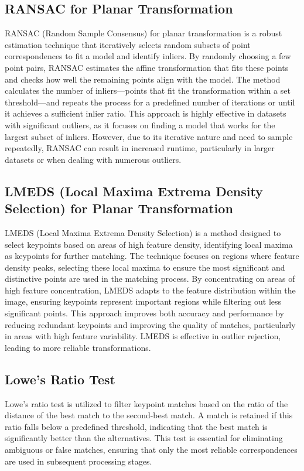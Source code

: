 \subsection*{RANSAC for Planar Transformation}
RANSAC (Random Sample Consensus) for planar transformation is a robust estimation technique that iteratively selects random subsets of point correspondences to fit a model and identify inliers. By randomly choosing a few point pairs, RANSAC estimates the affine transformation that fits these points and checks how well the remaining points align with the model. The method calculates the number of inliers—points that fit the transformation within a set threshold—and repeats the process for a predefined number of iterations or until it achieves a sufficient inlier ratio. This approach is highly effective in datasets with significant outliers, as it focuses on finding a model that works for the largest subset of inliers. However, due to its iterative nature and need to sample repeatedly, RANSAC can result in increased runtime, particularly in larger datasets or when dealing with numerous outliers.


\subsection{LMEDS (Local Maxima Extrema Density Selection) for Planar Transformation}
LMEDS (Local Maxima Extrema Density Selection) is a method designed to select keypoints based on areas of high feature density, identifying local maxima as keypoints for further matching. The technique focuses on regions where feature density peaks, selecting these local maxima to ensure the most significant and distinctive points are used in the matching process. By concentrating on areas of high feature concentration, LMEDS adapts to the feature distribution within the image, ensuring keypoints represent important regions while filtering out less significant points. This approach improves both accuracy and performance by reducing redundant keypoints and improving the quality of matches, particularly in areas with high feature variability. LMEDS is effective in outlier rejection, leading to more reliable transformations.


\subsection*{Lowe's Ratio Test}

Lowe's ratio test is utilized to filter keypoint matches based on the ratio of the distance of the best match to the second-best match. A match is retained if this ratio falls below a predefined threshold, indicating that the best match is significantly better than the alternatives. This test is essential for eliminating ambiguous or false matches, ensuring that only the most reliable correspondences are used in subsequent processing stages.

